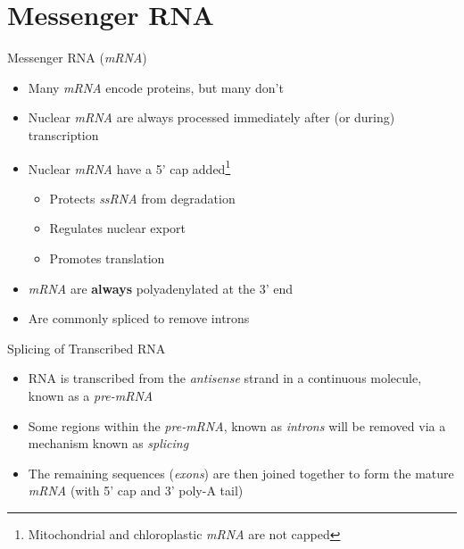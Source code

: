 \documentclass[aspectratio=169,11pt]{beamer}
\begin{document}
\section{Messenger RNA}

\begin{frame}{Messenger RNA (\textit{mRNA})}

	\begin{itemize}
		\item Many \textit{mRNA} encode proteins, but many don't 
		\item Nuclear \textit{mRNA} are always processed immediately after (or during) transcription 
		\item Nuclear \textit{mRNA} have a 5' cap added\footnote{Mitochondrial and chloroplastic \textit{mRNA} are not capped}
		\begin{itemize}
			\item Protects \textit{ssRNA} from degradation
			\item Regulates nuclear export
			\item Promotes translation
		\end{itemize}
		\item \textit{mRNA} are \textbf{always} polyadenylated at the 3' end
		\item Are commonly spliced to remove introns
		
	\end{itemize}

\end{frame}

\begin{frame}{Splicing of Transcribed RNA}

	\begin{itemize}
		\item RNA is transcribed from the \textit{antisense} strand in a continuous molecule, known as a \textit{pre-mRNA}
		\item Some regions within the \textit{pre-mRNA}, known as \textit{introns} will be removed via a mechanism known as \textit{splicing}
		\item The remaining sequences (\textit{exons}) are then joined together to form the mature \textit{mRNA} (with 5' cap and 3' poly-A tail)
	\end{itemize}

\end{frame}
\end{document}
